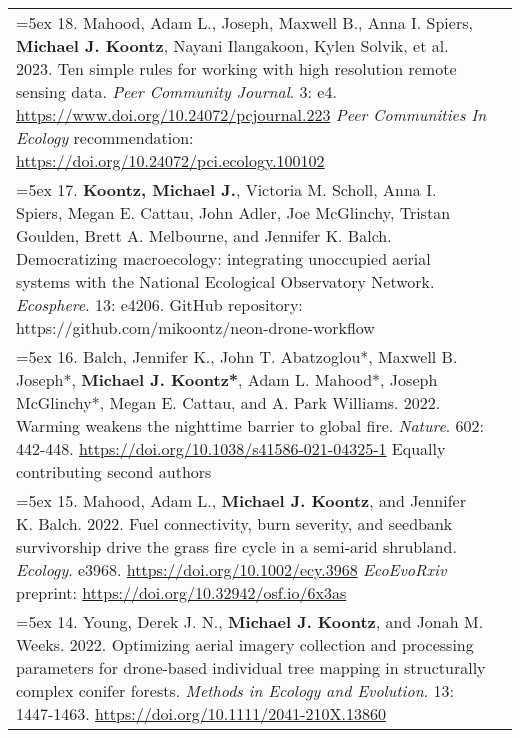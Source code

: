 \begin{longtable}{@{} >{\raggedright}p{6.10in} >{\raggedleft}X @{}}

\hangindent=5ex 18. Mahood, Adam L., Joseph, Maxwell B., Anna I. Spiers, \textbf{Michael J. Koontz}, Nayani Ilangakoon, Kylen Solvik, et al. 2023. Ten simple rules for working with high resolution remote sensing data. \emph{Peer Community Journal}. 3: e4. \href{https://www.doi.org/10.24072/pcjournal.223}{https://www.doi.org/10.24072/pcjournal.223}
\newline \emph{Peer Communities In Ecology} recommendation: \href{https://doi.org/10.24072/pci.ecology.100102}{https://doi.org/10.24072/pci.ecology.100102} & \tabularnewline

\hangindent=5ex 17. \textbf{Koontz, Michael J.}, Victoria M. Scholl, Anna I. Spiers, Megan E. Cattau, John Adler, Joe McGlinchy, Tristan Goulden, Brett A. Melbourne, and Jennifer K. Balch. Democratizing macroecology: integrating unoccupied aerial systems with the National Ecological Observatory Network. \emph{Ecosphere}. 13: e4206.
\newline GitHub repository: https://github.com/mikoontz/neon-drone-workflow & \tabularnewline

\hangindent=5ex 16. Balch, Jennifer K., John T. Abatzoglou*, Maxwell B. Joseph*, \textbf{Michael J. Koontz*}, Adam L. Mahood*, Joseph McGlinchy*, Megan E. Cattau, and A. Park Williams. 2022. Warming weakens the nighttime barrier to global fire. \emph{Nature}. 602: 442-448. \href{https://doi.org/10.1038/s41586-021-04325-1}{https://doi.org/10.1038/s41586-021-04325-1}
\newline *Equally contributing second authors & \tabularnewline

\hangindent=5ex 15. Mahood, Adam L., \textbf{Michael J. Koontz}, and Jennifer K. Balch. 2022. Fuel connectivity, burn severity, and seedbank survivorship drive the grass fire cycle in a semi-arid shrubland. \emph{Ecology}. e3968. \href{https://doi.org/10.1002/ecy.3968}{https://doi.org/10.1002/ecy.3968}
\newline \emph{EcoEvoRxiv} preprint: \href{https://doi.org/10.32942/osf.io/6x3as}{https://doi.org/10.32942/osf.io/6x3as} & \tabularnewline

\hangindent=5ex 14. Young, Derek J. N., \textbf{Michael J. Koontz}, and Jonah M. Weeks. 2022. Optimizing aerial imagery collection and processing parameters for drone-based individual tree mapping in structurally complex conifer forests. \emph{Methods in Ecology and Evolution}. 13: 1447-1463. \href{https://doi.org/10.1111/2041-210X.13860}{https://doi.org/10.1111/2041-210X.13860} & \tabularnewline


\end{longtable}
